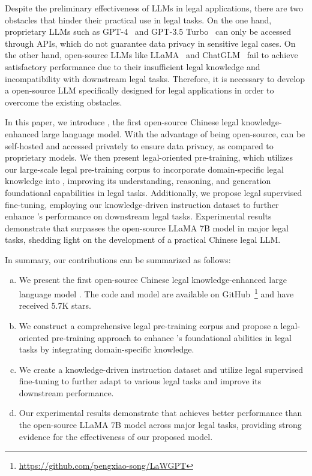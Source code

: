 Despite the preliminary effectiveness of LLMs in legal applications, there are two obstacles that hinder their practical use in legal tasks. 
On the one hand, proprietary LLMs such as GPT-4~\citep{GPT4} and GPT-3.5 Turbo~\citep{GPT35T} can only be accessed through APIs, which do not guarantee data privacy in sensitive legal cases. 
On the other hand, open-source LLMs like LLaMA~\citep{hugo23LLaMA} and ChatGLM~\citep{du2022glm} fail to achieve satisfactory performance due to their insufficient legal knowledge and incompatibility with downstream legal tasks. 
Therefore, it is necessary to develop a open-source LLM specifically designed for legal applications  in order to overcome the existing obstacles. 

In this paper, we introduce \algo, the first open-source Chinese legal knowledge-enhanced large language model. With the advantage of being open-source, \algo can be self-hosted and accessed privately to ensure data privacy, as compared to proprietary models. We then present legal-oriented pre-training, which utilizes our large-scale legal pre-training corpus to incorporate domain-specific legal knowledge into \algo, improving its understanding, reasoning, and generation foundational capabilities in legal tasks. 
Additionally, we propose legal supervised fine-tuning, employing our knowledge-driven instruction dataset to further enhance \algo's performance on downstream legal tasks. 
Experimental results demonstrate that \algo surpasses the open-source LLaMA 7B model in major legal tasks, shedding light on the development of a practical Chinese legal LLM. 

In summary, our contributions can be summarized as follows: 
\begin{enumerate}[(a)]
    \item We present the first open-source Chinese legal knowledge-enhanced large language model \algo. The code and model are available on GitHub~\footnote{\url{https://github.com/pengxiao-song/LaWGPT}} and have received 5.7K stars.
    \item We construct a comprehensive legal pre-training corpus and propose a legal-oriented pre-training approach to enhance \algo's foundational abilities in legal tasks by integrating domain-specific knowledge.
    \item We create a knowledge-driven instruction dataset and utilize legal supervised fine-tuning to further adapt \algo to various legal tasks and improve its downstream performance.
    \item Our experimental results demonstrate that \algo achieves better performance than the open-source LLaMA 7B model across major legal tasks, providing strong evidence for the effectiveness of our proposed model.
\end{enumerate}

